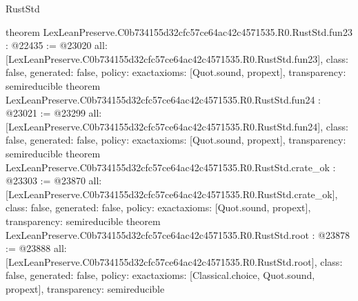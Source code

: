 \begin{lexlean}{RustStd}
\begin{coremodule}
{}
theorem LexLeanPreserve.C0b734155d32cfc57ce64ac42c4571535.R0.RustStd.fun23 : @22435 := @23020 {
  all: [LexLeanPreserve.C0b734155d32cfc57ce64ac42c4571535.R0.RustStd.fun23],
  class: false,
  generated: false,
  policy: exact{axioms: [Quot.sound, propext]},
  transparency: semireducible
}
theorem LexLeanPreserve.C0b734155d32cfc57ce64ac42c4571535.R0.RustStd.fun24 : @23021 := @23299 {
  all: [LexLeanPreserve.C0b734155d32cfc57ce64ac42c4571535.R0.RustStd.fun24],
  class: false,
  generated: false,
  policy: exact{axioms: [Quot.sound, propext]},
  transparency: semireducible
}
theorem LexLeanPreserve.C0b734155d32cfc57ce64ac42c4571535.R0.RustStd.crate_ok : @23303 := @23870 {
  all: [LexLeanPreserve.C0b734155d32cfc57ce64ac42c4571535.R0.RustStd.crate_ok],
  class: false,
  generated: false,
  policy: exact{axioms: [Quot.sound, propext]},
  transparency: semireducible
}
theorem LexLeanPreserve.C0b734155d32cfc57ce64ac42c4571535.R0.RustStd.root : @23878 := @23888 {
  all: [LexLeanPreserve.C0b734155d32cfc57ce64ac42c4571535.R0.RustStd.root],
  class: false,
  generated: false,
  policy: exact{axioms: [Classical.choice, Quot.sound, propext]},
  transparency: semireducible
}


\end{coremodule}
\end{lexlean}
